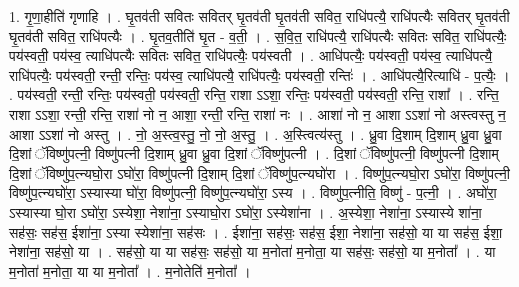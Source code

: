 \documentclass[17pt]{extarticle}
\begin{document}
1. गृ॒णा॒हीति॑ गृणाहि । . घृ॒तव॑ती सवितः सवितर् घृ॒तव॑ती घृ॒तव॑ती सवित॒ राधि॑पत्यै॒ राधि॑पत्यैः सवितर् घृ॒तव॑ती घृ॒तव॑ती सवित॒ राधि॑पत्यैः । . घृ॒तव॒तीति॑ घृ॒त - व॒ती॒ । . स॒वि॒त॒ राधि॑पत्यै॒ राधि॑पत्यैः सवितः सवित॒ राधि॑पत्यैः॒ पय॑स्वती॒ पय॑स्व॒ त्याधि॑पत्यैः सवितः सवित॒ राधि॑पत्यैः॒ पय॑स्वती । . आधि॑पत्यैः॒ पय॑स्वती॒ पय॑स्व॒ त्याधि॑पत्यै॒ राधि॑पत्यैः॒ पय॑स्वती॒ रन्ती॒ रन्तिः॒ पय॑स्व॒ त्याधि॑पत्यै॒ राधि॑पत्यैः॒ पय॑स्वती॒ रन्तिः॑ । . आधि॑पत्यै॒रित्याधि॑ - प॒त्यैः॒ । . पय॑स्वती॒ रन्ती॒ रन्तिः॒ पय॑स्वती॒ पय॑स्वती॒ रन्ति॒ राशा ऽऽशा॒ रन्तिः॒ पय॑स्वती॒ पय॑स्वती॒ रन्ति॒ राशा᳚ । . रन्ति॒ राशा ऽऽशा॒ रन्ती॒ रन्ति॒ राशा॑ नो न॒ आशा॒ रन्ती॒ रन्ति॒ राशा॑ नः । . आशा॑ नो न॒ आशा ऽऽशा॑ नो अस्त्वस्तु न॒ आशा ऽऽशा॑ नो अस्तु । . नो॒ अ॒स्त्व॒स्तु॒ नो॒ नो॒ अ॒स्तु॒ । . अ॒स्त्वित्य॑स्तु । . ध्रु॒वा दि॒शाम् दि॒शाम् ध्रु॒वा ध्रु॒वा दि॒शां ॅविष्णु॑पत्नी॒ विष्णु॑पत्नी दि॒शाम् ध्रु॒वा ध्रु॒वा दि॒शां ॅविष्णु॑पत्नी । . दि॒शां ॅविष्णु॑पत्नी॒ विष्णु॑पत्नी दि॒शाम् दि॒शां ॅविष्णु॑प॒त्न्यघो॒रा ऽघो॑रा॒ विष्णु॑पत्नी दि॒शाम् दि॒शां ॅविष्णु॑प॒त्न्यघो॑रा । . विष्णु॑प॒त्न्यघो॒रा ऽघो॑रा॒ विष्णु॑पत्नी॒ विष्णु॑प॒त्न्यघो॑रा॒ ऽस्यास्या घो॑रा॒ विष्णु॑पत्नी॒ 
विष्णु॑प॒त्न्यघो॑रा॒ ऽस्य । . विष्णु॑प॒त्नीति॒ विष्णु॑ - प॒त्नी॒ । . अघो॑रा॒ ऽस्यास्या घो॒रा ऽघो॑रा॒ ऽस्येशा॒ नेशा॑ना॒ ऽस्याघो॒रा ऽघो॑रा॒ ऽस्येशा॑ना । . अ॒स्येशा॒ नेशा॑ना॒ ऽस्यास्ये शा॑ना॒ सह॑सः॒ सह॑स॒ ईशा॑ना॒ ऽस्या स्येशा॑ना॒ सह॑सः । . ईशा॑ना॒ सह॑सः॒ सह॑स॒ ईशा॒ नेशा॑ना॒ सह॑सो॒ या या सह॑स॒ ईशा॒ नेशा॑ना॒ सह॑सो॒ या । . सह॑सो॒ या या सह॑सः॒ सह॑सो॒ या म॒नोता॑ म॒नोता॒ या सह॑सः॒ सह॑सो॒ या म॒नोता᳚ । . या म॒नोता॑ म॒नोता॒ या या म॒नोता᳚ । . म॒नोतेति॑ म॒नोता᳚ । \newline
\end{document}
